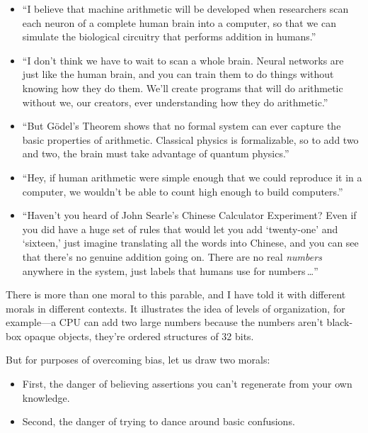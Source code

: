 {\begin{itemize}
\item {
 ``I believe that machine arithmetic will be
developed when researchers scan each neuron of a complete human brain
into a computer, so that we can simulate the biological circuitry that
performs addition in humans.''}

\item {
 ``I don't think we have to wait
to scan a whole brain. Neural networks are just like the human brain,
and you can train them to do things without knowing how they do them.
We'll create programs that will do arithmetic without
we, our creators, ever understanding how they do
arithmetic.''}

\item {
 ``But Gödel's Theorem shows that
no formal system can ever capture the basic properties of arithmetic.
Classical physics is formalizable, so to add two and two, the brain
must take advantage of quantum physics.''}

\item {
 ``Hey, if human arithmetic were simple enough
that we could reproduce it in a computer, we wouldn't
be able to count high enough to build computers.''}

\item {
 ``Haven't you heard of John
Searle's Chinese Calculator Experiment? Even if you did
have a huge set of rules that would let you add
`twenty-one' and
`sixteen,' just imagine translating all
the words into Chinese, and you can see that there's no
genuine addition going on. There are no real \textit{numbers} anywhere
in the system, just labels that humans use for numbers\,\ldots''}
\end{itemize}

{
 There is more than one moral to this parable, and I have told it
with different morals in different contexts. It illustrates the idea of
levels of organization, for example---a CPU can add two large numbers
because the numbers aren't black-box opaque objects,
they're ordered structures of 32 bits.}

{
 But for purposes of overcoming bias, let us draw two morals:}

\begin{itemize}
\item {
 First, the danger of believing assertions you
can't regenerate from your own knowledge.}

\item {
  Second, the danger of trying to dance around basic confusions.}
\end{itemize}

}
